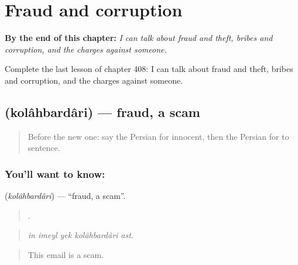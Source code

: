 
\chapter{Fraud and corruption}
\label{ch:fa-fraud-and-corruption}

\begin{chapteropening}
\textbf{By the end of this chapter:} \emph{I can talk about fraud and theft, bribes and corruption, and the charges against someone.}

Complete the last lesson of chapter 408: I can talk about fraud and theft, bribes and corruption, and the charges against someone.
\end{chapteropening}

\section[\texorpdfstring{\fa{کلاهبرداری} (kolâhbardâri)}{کلاهبرداری (kolâhbardâri)}]{ (kolâhbardâri) — fraud, a scam}

\label{lesson:FA-C408-kolahbardari}



\begin{quote}
Before the new one: say the Persian for innocent, then the Persian for to sentence.
\end{quote}

\subsection*{You'll want to know: }
\textbf{} (\emph{kolâhbardâri}) — \textquotedblleft{}fraud, a scam\textquotedblright{}.

\begin{quote}
    .
\end{quote}

\begin{quote}
\emph{in imeyl yek kolâhbardâri ast.}
\end{quote}

\begin{quote}
This email is a scam.
\end{quote}

